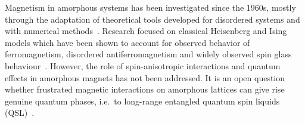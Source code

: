\documentclass[%
 reprint,
superscriptaddress,
 amsmath,amssymb,
aps,
]{revtex4-2}
\begin{document}
Magnetism in amorphous systems has been investigated since the 1960s, mostly through the adaptation of theoretical tools developed for disordered systems \cite{aharony1975critical,Petrakovski1981,kaneyoshi1992introduction,Kaneyoshi2018} and with numerical methods~\cite{fahnle1984monte,plascak2000ising}. Research focused on classical Heisenberg and Ising models which have been shown to account for observed behavior of ferromagnetism, disordered antiferromagnetism and widely observed spin glass behaviour~\cite{coey1978amorphous}. However, the role of spin-anisotropic interactions and quantum effects in amorphous magnets has not been addressed. It is an open question whether frustrated magnetic interactions on amorphous lattices can give rise genuine quantum phases, i.e.~to long-range entangled quantum spin liquids (QSL)~\cite{Anderson1973,Knolle2019,Savary2016,Lacroix2011}. 




\end{document}
